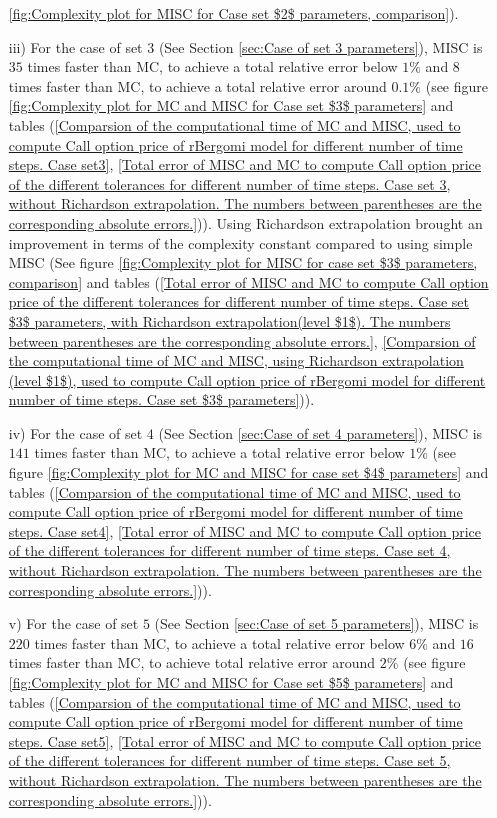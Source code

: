 \begin{enumerate}
\ref{fig:Complexity plot for  MISC for Case set $2$ parameters, comparison}).
		
		
		
		
			\item [iii)]  For the case of set $3$ (See Section \ref{sec:Case of set 3 parameters}), MISC is  $35$ times faster than MC, to achieve  a total relative error below $1\%$ and $8$ times faster than MC, to achieve a total relative error around $0.1\%$ (see figure \ref{fig:Complexity plot for MC and MISC for Case set $3$ parameters} and tables (\ref{Comparsion of the computational time of  MC and MISC, used to compute Call option price of rBergomi model for different number of time steps. Case set3}, \ref{Total error of MISC and MC to compute Call option price of the different tolerances for different number of time steps. Case set 3, without Richardson extrapolation. The numbers between parentheses are the corresponding absolute errors.})). Using Richardson extrapolation brought an improvement in terms of the  complexity constant compared to using simple MISC (See figure \ref{fig:Complexity plot for  MISC for case set $3$ parameters, comparison} and tables (\ref{Total  error of MISC and MC to compute Call option price of the different tolerances for different number of time steps. Case set $3$ parameters, with Richardson extrapolation(level $1$). The numbers between parentheses are the corresponding absolute errors.}, \ref{Comparsion of the computational time of  MC and MISC, using Richardson extrapolation (level $1$), used to compute Call option price of rBergomi model for different number of time steps. Case set $3$ parameters})).
				
	 	\item [iv)] For the case of set $4$ (See Section \ref{sec:Case of set 4 parameters}), MISC is  $141$ times faster than MC, to achieve a total relative error below $1\%$ (see figure \ref{fig:Complexity plot for MC and MISC for case set $4$ parameters} and tables (\ref{Comparsion of the computational time of  MC and MISC, used to compute Call option price of rBergomi model for different number of time steps. Case set4}, \ref{Total error of MISC and MC to compute Call option price of the different tolerances for different number of time steps. Case set 4, without Richardson extrapolation. The numbers between parentheses are the corresponding absolute errors.})).
		
	\item [v)] For the case of set $5$ (See Section \ref{sec:Case of set 5 parameters}), MISC is  $220$ times faster than MC, to achieve a total relative error below $6\%$ and $16$ times faster than MC, to achieve total relative error around $2\%$  (see figure \ref{fig:Complexity plot for MC and MISC for Case set $5$ parameters} and tables (\ref{Comparsion of the computational time of  MC and MISC, used to compute Call option price of rBergomi model for different number of time steps. Case set5}, \ref{Total error of MISC and MC to compute Call option price of the different tolerances for different number of time steps. Case set 5, without Richardson extrapolation. The numbers between parentheses are the corresponding absolute errors.})).
		

\end{enumerate}
